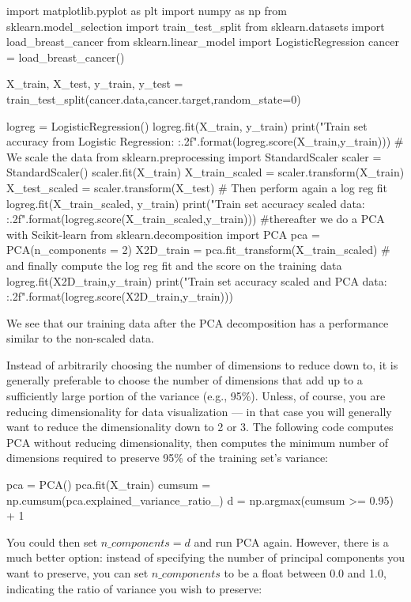\documentclass[%
oneside,                 %
final,                   %
10pt]{article}
\begin{document}
\bpycod
import matplotlib.pyplot as plt
import numpy as np
from sklearn.model_selection import  train_test_split 
from sklearn.datasets import load_breast_cancer
from sklearn.linear_model import LogisticRegression
cancer = load_breast_cancer()

X_train, X_test, y_train, y_test = train_test_split(cancer.data,cancer.target,random_state=0)

logreg = LogisticRegression()
logreg.fit(X_train, y_train)
print("Train set accuracy from Logistic Regression: {:.2f}".format(logreg.score(X_train,y_train)))
# We scale the data
from sklearn.preprocessing import StandardScaler
scaler = StandardScaler()
scaler.fit(X_train)
X_train_scaled = scaler.transform(X_train)
X_test_scaled = scaler.transform(X_test)
# Then perform again a log reg fit
logreg.fit(X_train_scaled, y_train)
print("Train set accuracy scaled data: {:.2f}".format(logreg.score(X_train_scaled,y_train)))
#thereafter we do a PCA with Scikit-learn
from sklearn.decomposition import PCA
pca = PCA(n_components = 2)
X2D_train = pca.fit_transform(X_train_scaled)
# and finally compute the log reg fit and the score on the training data	
logreg.fit(X2D_train,y_train)
print("Train set accuracy scaled and PCA data: {:.2f}".format(logreg.score(X2D_train,y_train)))


\epycod


We see that our training data after the PCA decomposition has a performance similar to the non-scaled data. 

Instead of arbitrarily choosing the number of dimensions to reduce down to, it is generally preferable to
choose the number of dimensions that add up to a sufficiently large portion of the variance (e.g., 95\%).
Unless, of course, you are reducing dimensionality for data visualization — in that case you will
generally want to reduce the dimensionality down to 2 or 3.
The following code computes PCA without reducing dimensionality, then computes the minimum number
of dimensions required to preserve 95\% of the training set’s variance:





\bpycod
pca = PCA()
pca.fit(X_train)
cumsum = np.cumsum(pca.explained_variance_ratio_)
d = np.argmax(cumsum >= 0.95) + 1

\epycod

You could then set $n\_components=d$ and run PCA again. However, there is a much better option: instead
of specifying the number of principal components you want to preserve, you can set $n\_components$ to be
a float between 0.0 and 1.0, indicating the ratio of variance you wish to preserve:
\end{document}

